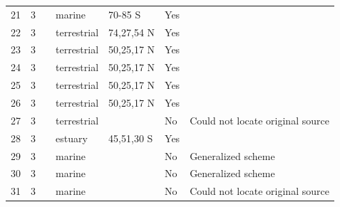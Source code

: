 \documentclass[12pt]{article}
\begin{document}
\begin{landscape}
\begin{table}[h!]
{\begin{tabular}{p{2.8cm}p{1.3cm}p{5.5cm}p{2.2cm}p{2.5cm}lp{3.5cm}}
        21    & 3 & \citet{Patten1979}  & marine & 70-85 S & Yes   &       \\
        22    & 3 & \citet{Summerhayes1923}  & terrestrial & 74,27,54 N & Yes   &       \\
        23    & 3 & \citet{Bird1930}  & terrestrial & 50,25,17 N & Yes   &       \\
        24    & 3 & \citet{Bird1930}  & terrestrial & 50,25,17 N & Yes   &       \\
        25    & 3 & \citet{Bird1930}  & terrestrial & 50,25,17 N & Yes   &       \\
        26    & 3 & \citet{Bird1930}  & terrestrial & 50,25,17 N & Yes   &       \\
        27    & 3 & \citet{Varley1970}  & terrestrial &       & No    & Could not locate original source \\
        28    & 3 & \citet{Paviour-Smith1956}  & estuary & 45,51,30 S & Yes   &       \\
        29    & 3 & \citet{Dunbar1953}  & marine &       & No    & Generalized scheme \\
        30    & 3 & \citet{Mackintosh1964}  & marine &       & No    & Generalized scheme \\
        31    & 3 & \citet{Petipa1970}  & marine &       & No    & Could not locate original source \\
      \hline
      \end{tabular}}%
      \end{table}

        \newpage


\end{landscape}
\end{document}
